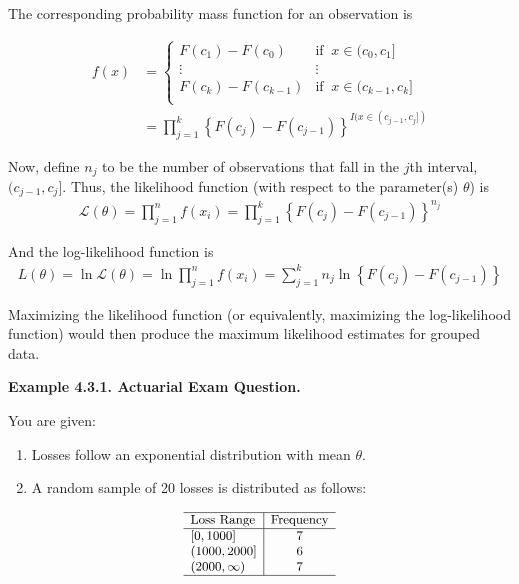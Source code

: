 \documentclass[]{book}
\providecommand{\tightlist}{%
  \setlength{\itemsep}{0pt}\setlength{\parskip}{0pt}}
\theoremstyle{definition}
\theoremstyle{definition}
\theoremstyle{definition}
\theoremstyle{remark}
\begin{document}
The corresponding probability mass function for an observation is

\[
\begin{aligned}
f(x) &=
\begin{cases}
F(c_1) - F(c_{0}) &   \text{if }\ x \in (c_{0}, c_1]\\
\vdots & \vdots \\
F(c_k) - F(c_{k-1}) &   \text{if }\ x \in (c_{k-1}, c_k]\\
\end{cases} \\
&= \prod_{j=1}^k \left\{F(c_j) - F(c_{j-1})\right\}^{I(x \in (c_{j-1}, c_j])}
\end{aligned}
\]

Now, define \(n_j\) to be the number of observations that fall in the
\(j\)th interval, \((c_{j-1}, c_j]\). Thus, the likelihood function
(with respect to the parameter(s) \(\theta\)) is \[
\begin{aligned}
\mathcal{L}(\theta) = \prod_{j=1}^n f(x_i) = \prod_{j=1}^k \left\{F(c_j) - F(c_{j-1})\right\}^{n_j}
\end{aligned}
\]

And the log-likelihood function is \[
\begin{aligned}
L(\theta) = \ln \mathcal{L}(\theta) = \ln \prod_{j=1}^n f(x_i) = \sum_{j=1}^k n_j \ln \left\{F(c_j) - F(c_{j-1})\right\}
\end{aligned}
\]

Maximizing the likelihood function (or equivalently, maximizing the
log-likelihood function) would then produce the maximum likelihood
estimates for grouped data.

\textbf{Example 4.3.1. Actuarial Exam Question.}

You are given:

\begin{enumerate}
\def\labelenumi{(\roman{enumi})}
\tightlist
\item
  Losses follow an exponential distribution with mean \(\theta\).
\item
  A random sample of 20 losses is distributed as follows:
\end{enumerate}

\[
{\small
\begin{array}{l|c}
\hline
\text{Loss Range} & \text{Frequency} \\
\hline
[0,1000] & 7 \\
(1000,2000] & 6 \\
(2000,\infty) & 7 \\
\hline
\end{array}
}
\]
\end{document}
